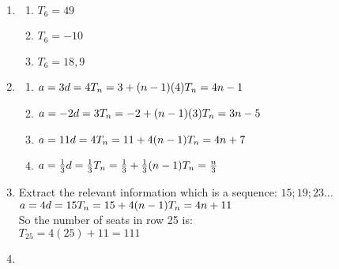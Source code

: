  \begin{eocsolutions}{}{
\begin{enumerate}[itemsep=5pt, label=\textbf{\arabic*}. ] 
 \item \begin{multicols}{2}



  \begin{enumerate}[noitemsep, label=\textbf{(\alph*)} ]
  \item $T_6 = 49$
  \item $T_6 = -10$
  \item $T_6 = 18,9$
  \end{enumerate}
\end{multicols}
\item \begin{multicols}{2}
  \begin{enumerate}[noitemsep, label=\textbf{(\alph*)} ]
  \item $a = 3\\
d = 4\\
T_n = 3 + (n - 1)(4)\\
T_n = 4n - 1$ 
  \item $a = -2\\
d = 3\\
T_n = -2 + (n-1)(3) \\
T_n = 3n -5$ 
  \item $a = 11\\
d = 4\\
T_n = 11 + 4(n-1)\\
T_n = 4n + 7 $ 
  \item $a = \frac{1}{3}\\
d = \frac{1}{3}\\
T_n = \frac{1}{3} + \frac{1}{3}(n - 1)\\
T_n = \frac{n}{3} $ 
  \end{enumerate}
\end{multicols}
\item Extract the relevant information which is a sequence: $15; 19 ; 23 \ldots$\\
 $a = 4\\
d = 15\\
T_n = 15 + 4(n - 1)\\
T_n = 4n + 11 $ \\
So the number of seats in row 25 is:\\
$T_{25} = 4(25) + 11 = 111$ 
\item 
  \begin{enumerate}[noitemsep, label=\textbf{(\alph*)} ]

\end{enumerate}
\end{enumerate}}
\end{eocsolutions}
